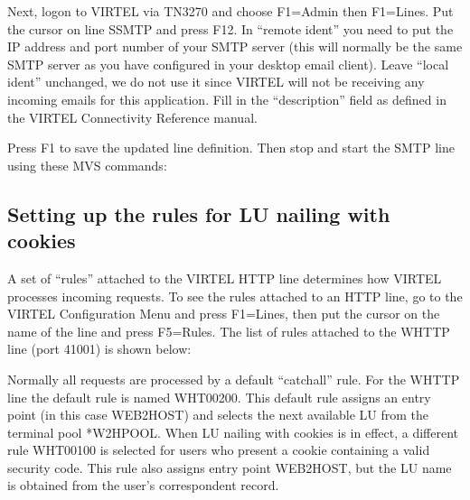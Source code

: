 \documentclass[letterpaper,10pt,english]{sphinxmanual}
\begin{document}
\sphinxAtStartPar
Next, logon to VIRTEL via TN3270 and choose F1=Admin then F1=Lines.  Put the cursor on line S\sphinxhyphen{}SMTP and press F12.  In “remote ident” you need to put the IP address and port number of your SMTP server (this will normally be the same SMTP server as you have configured in your desktop e\sphinxhyphen{}mail client).  Leave “local ident” unchanged, we do not use it since VIRTEL will not be receiving any incoming e\sphinxhyphen{}mails for this application.  Fill in the “description” field as defined in the VIRTEL Connectivity Reference manual.

\sphinxAtStartPar
Press F1 to save the updated line definition. Then stop and start the SMTP line using these MVS commands:

\begin{sphinxVerbatim}[commandchars=\\\{\}]
 
 
\end{sphinxVerbatim}


\subsection{Setting up the rules for LU nailing with cookies}
\label{\detokenize{connectivity_guide:setting-up-the-rules-for-lu-nailing-with-cookies}}
\sphinxAtStartPar
A set of “rules” attached to the VIRTEL HTTP line determines how VIRTEL processes incoming requests.  To see the rules attached to an HTTP line, go to the VIRTEL Configuration Menu and press F1=Lines, then put the cursor on the name of the line and press F5=Rules.  The list of rules attached to the W\sphinxhyphen{}HTTP line (port 41001) is shown below:

\sphinxAtStartPar
{}

\sphinxAtStartPar
{}

\sphinxAtStartPar
Normally all requests are processed by a default “catch\sphinxhyphen{}all” rule.  For the W\sphinxhyphen{}HTTP line the default rule is named WHT00200.  This default rule assigns an entry point (in this case WEB2HOST) and selects the next available LU from the terminal pool *W2HPOOL.  When LU nailing with cookies is in effect, a different rule WHT00100 is selected for users who present a cookie containing a valid security code.  This rule also assigns entry point WEB2HOST, but the LU name is obtained from the user’s correspondent record.
\end{document}
